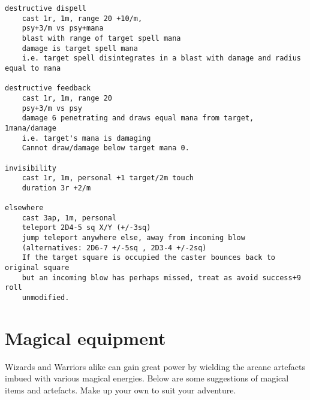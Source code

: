 \small \begin{verbatim}
destructive dispell
    cast 1r, 1m, range 20 +10/m, 
    psy+3/m vs psy+mana
    blast with range of target spell mana
    damage is target spell mana
    i.e. target spell disintegrates in a blast with damage and radius equal to mana

destructive feedback
    cast 1r, 1m, range 20
    psy+3/m vs psy
    damage 6 penetrating and draws equal mana from target, 1mana/damage
    i.e. target's mana is damaging
    Cannot draw/damage below target mana 0.

invisibility
    cast 1r, 1m, personal +1 target/2m touch
    duration 3r +2/m

elsewhere
    cast 3ap, 1m, personal
    teleport 2D4-5 sq X/Y (+/-3sq)
    jump teleport anywhere else, away from incoming blow
    (alternatives: 2D6-7 +/-5sq , 2D3-4 +/-2sq)
    If the target square is occupied the caster bounces back to original square
    but an incoming blow has perhaps missed, treat as avoid success+9 roll
    unmodified.
\end{verbatim} \normalsize


%






\section*{Magical equipment}

Wizards and Warriors alike can gain great power by wielding the arcane artefacts imbued with various magical energies. Below are some suggestions of magical items and artefacts. Make up your own to suit your adventure.

